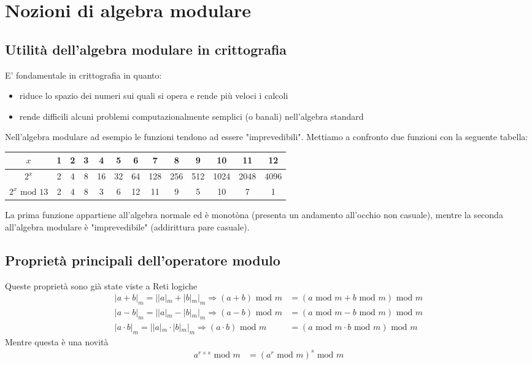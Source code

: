 \chapter{Nozioni di algebra modulare}
\section{Utilità dell'algebra modulare in crittografia}
E' fondamentale in crittografia in quanto:
\begin{itemize}
	\item riduce lo spazio dei numeri sui quali si opera e rende più veloci i calcoli
	\item rende difficili alcuni problemi computazionalmente semplici (o banali) nell'algebra standard
\end{itemize}
Nell'algebra modulare ad esempio le funzioni tendono ad essere "imprevedibili". Mettiamo a confronto due funzioni con la seguente tabella:
\begin{table}[ht!]
	\centering
	\small
	\begin{tabular}{c|c c c c c c c c c c c c}
		$x$ & 1 & 2 & 3 & 4 & 5 & 6 & 7 & 8 & 9 & 10 & 11 & 12  \\
		\hline
		$2^{x}$ & 2 & 4 & 8 & 16 & 32 & 64 & 128 & 256 & 512 & 1024 & 2048 & 4096  \\
		$2^{x} \text{ mod } 13$ & 2 & 4 & 8 & 3 & 6 & 12 & 11 & 9 & 5 & 10 & 7 & 1  \\
	\end{tabular}
\end{table}
La prima funzione appartiene all'algebra normale ed è monotòna (presenta un andamento all'occhio non casuale), mentre la seconda all'algebra modulare è "imprevedibile" (addirittura pare casuale).

\section{Proprietà principali dell'operatore modulo}
Queste proprietà sono già state viste a Reti logiche
\begin{align*}
	|a + b|_m = ||a|_m+|b|_m|_m \Longrightarrow (a+b) \text{ mod } m &= (a \text{ mod } m + b \text{ mod } m) \text{ mod } m\\
	|a - b|_m = ||a|_m-|b|_m|_m \Longrightarrow (a-b) \text{ mod } m &= (a \text{ mod } m - b \text{ mod } m) \text{ mod } m\\
	|a \cdot b|_m = ||a|_m\cdot |b|_m|_m \Longrightarrow (a \cdot b) \text{ mod } m &= (a \text{ mod } m \cdot b \text{ mod } m) \text{ mod } m
\end{align*}
Mentre questa è una novità
\begin{align*}
	a^{r \times s} \text{ mod } m &= (a^r \text{ mod } m)^{s} \text{ mod } m
\end{align*} 

